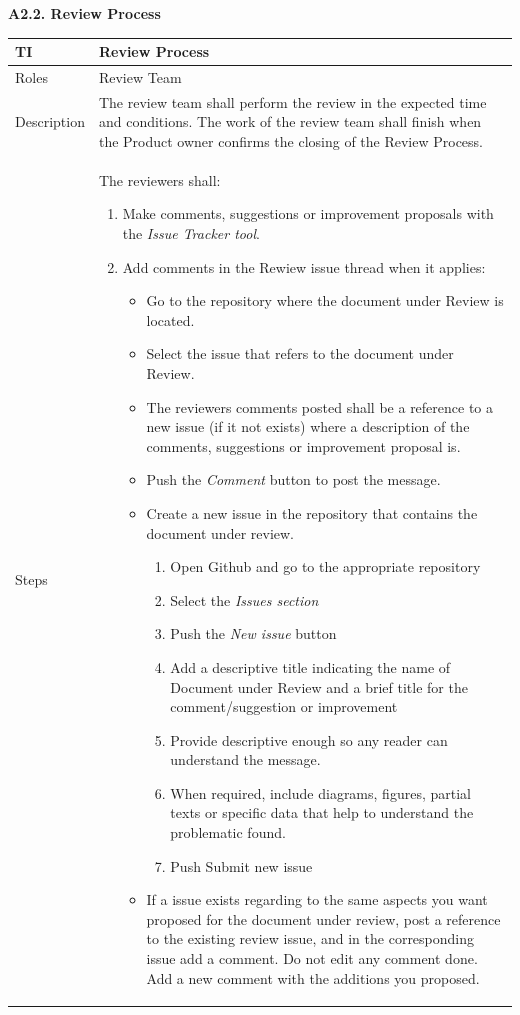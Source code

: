 \documentclass{template/openetcs_article}
\begin{document}
\textbf{A2.2. Review Process}
\begin{table}[H]
\begin{tabular}{|m{2cm}|m{12cm}|}
\hline
\rowcolor{myblue}
TI & 
Review Process
\\\hline
Roles &
Review Team
\\\hline
Description &
The review team shall perform the review in the expected time and conditions. The work of the review team shall finish when the Product owner confirms the closing of the Review Process.
\\\hline
Steps &
The reviewers shall:
\begin{enumerate}
\item Make comments, suggestions or improvement proposals with the {\it Issue Tracker tool}.
\item Add comments in the Rewiew issue thread when it applies:
\begin{itemize}
\item Go to the repository where the document under Review is located.
\item Select the issue that refers to the document under Review.
\item The reviewers comments posted shall be a reference to a new issue (if it not exists) where a description of the comments, suggestions or improvement proposal is.
\item Push the {\it Comment} button to post the message.
\item Create a new issue in the repository that contains the document under review. 
\begin{enumerate}
\item Open Github and go to the appropriate repository
\item Select the {\it Issues section}
\item Push the {\it New issue} button
\item Add a descriptive title indicating the name of Document under Review and a brief title for the comment/suggestion or improvement
\item Provide descriptive enough so any reader can understand the message.
\item When required, include diagrams, figures, partial texts or specific data that help to understand the problematic found.
\item Push Submit new issue
\end{enumerate}
\item If a issue exists regarding to the same aspects you want proposed for the document under review, post a reference to the existing review issue, and in the corresponding issue add a comment. Do not edit any comment done. Add a new comment with the additions you proposed.

\end{itemize}
\end{enumerate}
\end{tabular}
\end{table}
\end{document}
